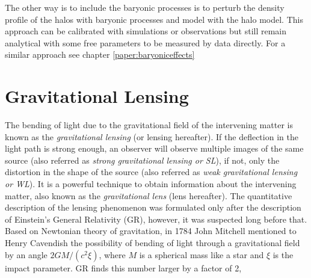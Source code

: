 The other way is to include the baryonic processes is to perturb the density profile 
of the halos with baryonic processes and model with the halo model. This approach can 
be calibrated with simulations or observations but still remain analytical with some 
free parameters to be measured by data directly. 
For a similar approach see chapter \ref{paper:baryoniceffects}



\clearpage
\section{Gravitational Lensing}
The bending of light due to the gravitational field of the intervening matter is known as
the {\it gravitational lensing} (or lensing hereafter). If the deflection in the light
path is strong enough, an observer will observe multiple images of the same source 
(also referred as {\it strong gravitational lensing or SL}), 
if not, only the distortion in the shape of the source  
(also referred as {\it weak gravitational lensing or WL}). It is a powerful technique to 
obtain information about the intervening matter, also known as the {\it gravitational
lens} (lens hereafter). The quantitative description of the lensing phenomenon
was formulated only after the description of Einstein's General Relativity (GR), however,
it was suspected long before that. Based on Newtonian theory of gravitation, in 1784 
John Mitchell mentioned to Henry Cavendish the possibility of bending of light
through a gravitational field by an angle $ 2GM/(c^2 \xi)$, where $M$ is a spherical
mass like a star and $\xi$ is the impact parameter. GR finds this number larger 
by a factor of 2,

